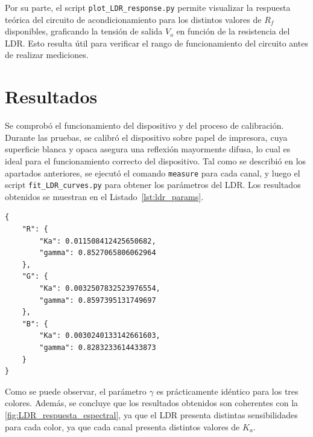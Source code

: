 \documentclass[12pt,a4paper,fleqn]{article}
\begin{document}
Por su parte, el script \verb|plot_LDR_response.py| permite visualizar la respuesta teórica del
circuito de acondicionamiento para los distintos valores de $R_f$ disponibles, graficando la
tensión de salida $V_o$ en función de la resistencia del LDR. Esto resulta útil para verificar
el rango de funcionamiento del circuito antes de realizar mediciones.



\section{Resultados}

Se comprobó el funcionamiento del dispositivo y del proceso de calibración. Durante las pruebas, se calibró el dispositivo sobre papel de impresora, cuya superficie blanca y opaca asegura una reflexión mayormente difusa, lo cual es ideal para el funcionamiento correcto del dispositivo. Tal como se describió en los apartados anteriores, se ejecutó el comando \verb|measure| para cada canal, y luego el script \verb|fit_LDR_curves.py| para obtener los parámetros del LDR. Los resultados obtenidos se muestran en el Listado~\ref{lst:ldr_params}.

\begin{lstlisting}[caption={Parametros obtenidos de la caracterización del LDR.}, label={lst:ldr_params}]
{
    "R": {
        "Ka": 0.011508412425650682,
        "gamma": 0.8527065806062964
    },
    "G": {
        "Ka": 0.0032507832523976554,
        "gamma": 0.8597395131749697
    },
    "B": {
        "Ka": 0.0030240133142661603,
        "gamma": 0.8283233614433873
    }
}
\end{lstlisting}

Como se puede observar, el parámetro $\gamma$ es prácticamente idéntico para los tres colores. Además, se concluye que los resultados obtenidos son coherentes con la \cref{fig:LDR_respuesta_espectral}, ya que el LDR presenta distintas sensibilidades para cada color, ya que cada canal presenta distintos valores de $K_a$.
\end{document}
